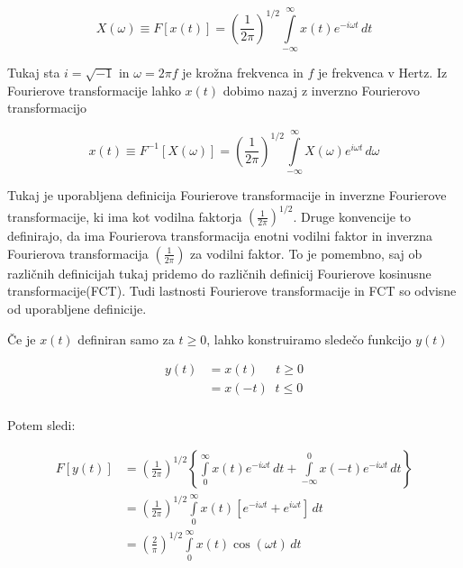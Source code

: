 \documentclass[a4paper,12pt,openright]{book}
\begin{document}
\begin{equation}
X(\omega) \equiv F[x(t)] = \left( \frac{1}{2 \pi} \right)^{1/2} \int\limits_{-\infty}^{\infty} x(t) e^{-i \omega t} \,dt
\label{eq:FT}
\end{equation}

Tukaj sta \(i = \sqrt{-1}\) in \(\omega = 2 \pi f\) je krožna frekvenca in \(f\) je frekvenca v Hertz. Iz Fourierove transformacije lahko \(x(t)\) dobimo nazaj z inverzno Fourierovo transformacijo

\begin{equation}
x(t) \equiv F^{-1}[X(\omega)] = \left( \frac{1}{2 \pi} \right)^{1/2} \int\limits_{-\infty}^{\infty} X(\omega) e^{i \omega t} \,d\omega
\label{eq:IFT}
\end{equation}

Tukaj je uporabljena definicija Fourierove transformacije in inverzne Fourierove transformacije, ki ima kot vodilna faktorja \(\left( \frac{1}{2 \pi} \right)^{1/2}\). Druge konvencije to definirajo, da ima Fourierova transformacija enotni vodilni faktor in inverzna Fourierova transformacija \(\left( \frac{1}{2 \pi} \right)\) za vodilni faktor. To je pomembno, saj ob različnih definicijah tukaj pridemo do različnih definicij Fourierove kosinusne transformacije(FCT). Tudi lastnosti Fourierove transformacije in FCT so odvisne od uporabljene definicije.\par

Če je \(x(t)\) definiran samo za \(t \geq 0\), lahko konstruiramo sledečo funkcijo \(y(t)\)

\begin{equation}
  \begin{aligned}
    y(t) & = x(t) \; \; \; \; \; t \geq 0\\
         & = x(-t) \; \; t \leq 0\\
  \end{aligned}
\end{equation}

Potem sledi:

\begin{equation}
  \begin{aligned}
    F[y(t)] & = \left( \frac{1}{2 \pi} \right)^{1/2}
              \left\{ \int\limits_{0}^{\infty} x(t) e^{-i \omega t} \,dt +
                  \int\limits_{-\infty}^{0} x(-t) e^{-i \omega t} \,dt \right\}\\
            & = \left( \frac{1}{2 \pi} \right)^{1/2}
                \int\limits_{0}^{\infty} x(t) \left[ e^{-i \omega t} + 
                                                     e^{i \omega t}\right] \,dt\\
            & = \left( \frac{2}{\pi} \right)^{1/2}
                \int\limits_{0}^{\infty} x(t)  \cos(\omega t) \,dt\\
  \end{aligned}
\label{eq:izpeljava_FCT}
\end{equation}
\end{document}
